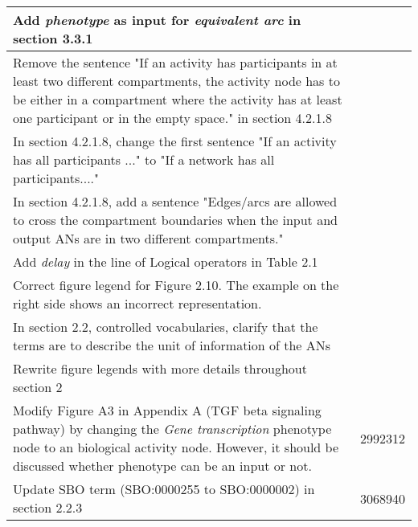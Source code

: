 \begin{center}
\begin{supertabular}{|p{12cm}|c|}
Add \emph{phenotype} as input for \emph{equivalent arc} in section 3.3.1 & \\\hline
Remove the sentence "If an activity has participants in at least two different compartments, the activity node has to be either in a compartment where the activity has at least one participant or in the empty space." in section 4.2.1.8 & \\\hline
In section 4.2.1.8, change the first sentence "If an activity has all participants ..." to "If a network has all participants...." & \\\hline
In section 4.2.1.8, add a sentence "Edges/arcs are allowed to cross the compartment boundaries when the input and output ANs are in two different compartments." & \\\hline
Add \emph{delay} in the line of Logical operators in Table 2.1 & \\\hline
Correct figure legend for Figure 2.10.  The example on the right side shows an incorrect representation. & \\\hline
In section 2.2, controlled vocabularies, clarify that the terms are to describe the unit of information of the ANs &
\\\hline
Rewrite figure legends with more details throughout section 2 &
\\\hline
Modify Figure A3 in Appendix A (TGF beta signaling pathway) by changing the \emph{Gene transcription} phenotype node to an biological activity node.  However, it should be discussed whether phenotype can be an input or not. & 2992312 \\\hline
Update SBO term (SBO:0000255 to SBO:0000002) in section 2.2.3  & 3068940 \\\hline
\end{supertabular}
\end{center}
